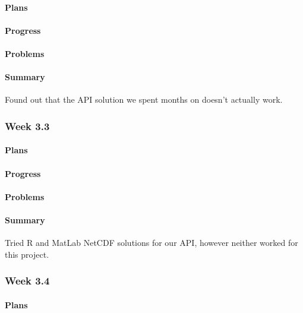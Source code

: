 \documentclass[onecolumn, draftclsnofoot,10pt, compsoc]{article}
\begin{document}
		    \paragraph{Plans} \hfill \break

		    \paragraph{Progress} \hfill \break

		    \paragraph{Problems} \hfill \break

		    \paragraph{Summary} \hfill \break
		            Found out that the API solution we spent months on doesn't actually work.


		\subsubsection{Week 3.3}
		    \paragraph{Plans} \hfill \break

		    \paragraph{Progress} \hfill \break

		    \paragraph{Problems} \hfill \break

		    \paragraph{Summary} \hfill \break
		        Tried R and MatLab NetCDF solutions for our API, however neither worked for this project.

		\subsubsection{Week 3.4}
		    \paragraph{Plans} \hfill \break
\end{document}
